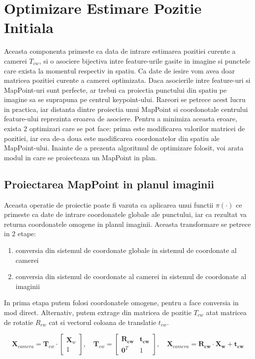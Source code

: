 \documentclass[12pt,a4paper]{report}
\begin{document}
\section{Optimizare Estimare Pozitie Initiala}
Aceasta componenta primeste ca data de intrare estimarea pozitiei curente a camerei
\(T_{cw}\), si o asociere bijectiva intre feature-urile gasite in imagine si punctele 
care exista la momentul respectiv in spatiu. Ca date de iesire vom avea doar matricea 
pozitiei curente a camerei optimizata. Daca asocierile intre feature-uri si MapPoint-uri
sunt perfecte, ar trebui ca proiectia punctului din spatiu pe imagine sa se suprapuna pe 
centrul keypoint-ului. Rareori se petrece acest lucru in practica, iar distanta dintre
proiectia unui MapPoint si coordonotale centrului feature-ului reprezinta eroarea de 
asociere. Pentru a minimiza aceasta eroare, exista 2 optimizari care se pot face:
prima este modificarea valorilor matricei de pozitiei, iar cea de-a doua este modificarea 
coordonatelor din spatiu ale MapPoint-ului. Inainte de a prezenta algoritmul de optimizare
folosit, voi arata modul in care se proiecteaza un MapPoint in plan.
\subsection{Proiectarea MapPoint in planul imaginii}
Aceasta operatie de proiectie poate fi vazuta ca aplicarea unui functii $ \pi(\cdot) $
ce primeste ca date de intrare coordonatele globale ale punctului, iar ca rezultat va
returna coordonatele omogene in planul imaginii. Aceasta transformare se petrece in 
2 etape:
\begin{enumerate}
    \item conversia din sistemul de coordonate globale in sistemul de coordonate al camerei
    \item conversia din sistemul de coordonate al camerei in sistemul de coordonate al imaginii
\end{enumerate}
In prima etapa putem folosi coordonatele omogene, pentru a face conversia in mod direct.
Alternativ, putem extrage din matricea de pozitie \(T_{cw}\) atat matricea de 
rotatie \(R_{cw}\) cat si vectorul coloana de translatie \(t_{cw}\).

\begin{equation}
\mathbf{X}_{camera} = \mathbf{T}_{cw} \cdot 
\begin{bmatrix}
\mathbf{X}_w \\
1
\end{bmatrix}, \quad
\mathbf{T}_{cw} =
\begin{bmatrix}
\mathbf{R_{cw}} & \mathbf{t_{cw}} \\
\mathbf{0}^T & 1
\end{bmatrix}, \quad
\mathbf{X}_{camera} = \mathbf{R_{cw}} \cdot \mathbf{X_w} + \mathbf{t_{cw}}
\end{equation}
\end{document}
